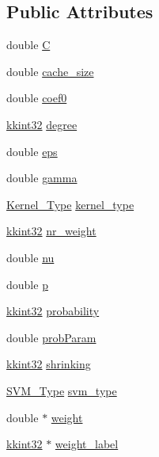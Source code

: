 \subsection*{Public Attributes}
\begin{DoxyCompactItemize}
\item 
double \hyperlink{struct_s_v_m289___b_f_s_1_1svm__parameter_a6e819bf58fb2b36b28cdf4abf22e3371}{C}
\item 
double \hyperlink{struct_s_v_m289___b_f_s_1_1svm__parameter_a2b25c48b9aa65c33e47dc3ed3368c30f}{cache\+\_\+size}
\item 
double \hyperlink{struct_s_v_m289___b_f_s_1_1svm__parameter_af0131a9fb06c4e9a071e51685632ad91}{coef0}
\item 
\hyperlink{namespace_k_k_b_a8fa4952cc84fda1de4bec1fbdd8d5b1b}{kkint32} \hyperlink{struct_s_v_m289___b_f_s_1_1svm__parameter_af2526e310e1a21859ad4aaa9de7bd6ce}{degree}
\item 
double \hyperlink{struct_s_v_m289___b_f_s_1_1svm__parameter_ade212e0b6eafc29ce3402fd8945d0ebf}{eps}
\item 
double \hyperlink{struct_s_v_m289___b_f_s_1_1svm__parameter_a88d6cddc31287ac0483272ff3fb9ea45}{gamma}
\item 
\hyperlink{namespace_s_v_m289___b_f_s_aad17f5250658b3fe42ba842df2ef2c6d}{Kernel\+\_\+\+Type} \hyperlink{struct_s_v_m289___b_f_s_1_1svm__parameter_a0855dd528ea40f3bb15d9de18c87a974}{kernel\+\_\+type}
\item 
\hyperlink{namespace_k_k_b_a8fa4952cc84fda1de4bec1fbdd8d5b1b}{kkint32} \hyperlink{struct_s_v_m289___b_f_s_1_1svm__parameter_aa0f9140ef46b5f6ead1976985039bd3b}{nr\+\_\+weight}
\item 
double \hyperlink{struct_s_v_m289___b_f_s_1_1svm__parameter_a6f25339a407582eca1800e6561b24ebc}{nu}
\item 
double \hyperlink{struct_s_v_m289___b_f_s_1_1svm__parameter_ae511b0f9f6d30b4f3d5348890b915e08}{p}
\item 
\hyperlink{namespace_k_k_b_a8fa4952cc84fda1de4bec1fbdd8d5b1b}{kkint32} \hyperlink{struct_s_v_m289___b_f_s_1_1svm__parameter_acfe1c2e7915f38fd2c82cbf7403f6428}{probability}
\item 
double \hyperlink{struct_s_v_m289___b_f_s_1_1svm__parameter_a7609863bd4ebc93577c59a67f2af3f71}{prob\+Param}
\item 
\hyperlink{namespace_k_k_b_a8fa4952cc84fda1de4bec1fbdd8d5b1b}{kkint32} \hyperlink{struct_s_v_m289___b_f_s_1_1svm__parameter_a6a9d76d8aa331811b0f7da59ebc5a79a}{shrinking}
\item 
\hyperlink{namespace_s_v_m289___b_f_s_a0dbbe5a38e648f011aedb361a8c48913}{S\+V\+M\+\_\+\+Type} \hyperlink{struct_s_v_m289___b_f_s_1_1svm__parameter_a670b1be49bd630113fbf92dce2ebd9c4}{svm\+\_\+type}
\item 
double $\ast$ \hyperlink{struct_s_v_m289___b_f_s_1_1svm__parameter_a72708216adcfcbaf21dc5133f7c30e07}{weight}
\item 
\hyperlink{namespace_k_k_b_a8fa4952cc84fda1de4bec1fbdd8d5b1b}{kkint32} $\ast$ \hyperlink{struct_s_v_m289___b_f_s_1_1svm__parameter_aa5fb22fef16001db2528f7ba4554758d}{weight\+\_\+label}
\end{DoxyCompactItemize}
